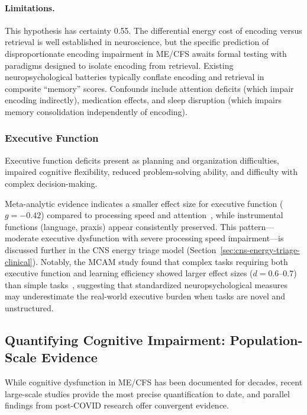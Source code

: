 \begin{hypothesis}
\paragraph{Limitations.}
This hypothesis has certainty 0.55. The differential energy cost of encoding versus retrieval is well established in neuroscience, but the specific prediction of disproportionate encoding impairment in ME/CFS awaits formal testing with paradigms designed to isolate encoding from retrieval. Existing neuropsychological batteries typically conflate encoding and retrieval in composite ``memory'' scores. Confounds include attention deficits (which impair encoding indirectly), medication effects, and sleep disruption (which impairs memory consolidation independently of encoding).
\end{hypothesis}

\subsubsection{Executive Function}

Executive function deficits present as planning and organization difficulties, impaired cognitive flexibility, reduced problem-solving ability, and difficulty with complex decision-making.

Meta-analytic evidence indicates a smaller effect size for executive function ($g = -0.42$) compared to processing speed and attention~\cite{Sebaiti2022cognitive}, while instrumental functions (language, praxis) appear consistently preserved. This pattern---moderate executive dysfunction with severe processing speed impairment---is discussed further in the CNS energy triage model (Section~\ref{sec:cns-energy-triage-clinical}). Notably, the MCAM study found that complex tasks requiring both executive function and learning efficiency showed larger effect sizes ($d = 0.6$--$0.7$) than simple tasks~\cite{Lange2024cognitive}, suggesting that standardized neuropsychological measures may underestimate the real-world executive burden when tasks are novel and unstructured.

\subsection{Quantifying Cognitive Impairment: Population-Scale Evidence}
\label{subsec:cognitive-quantification}

While cognitive dysfunction in ME/CFS has been documented for decades, recent large-scale studies provide the most precise quantification to date, and parallel findings from post-COVID research offer convergent evidence.

